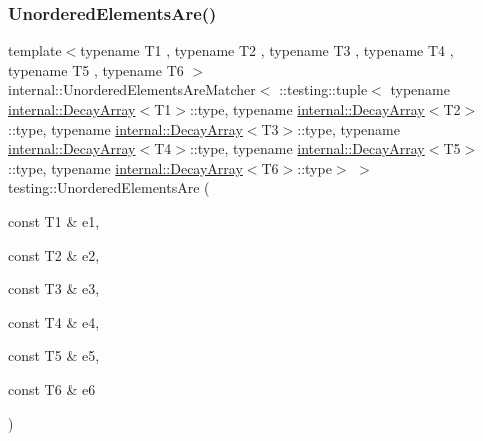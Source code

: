\subsubsection{\texorpdfstring{UnorderedElementsAre()}{UnorderedElementsAre()}\hspace{0.1cm}{\footnotesize\ttfamily [7/11]}}
{\footnotesize\ttfamily template$<$typename T1 , typename T2 , typename T3 , typename T4 , typename T5 , typename T6 $>$ \\
internal\+::\+Unordered\+Elements\+Are\+Matcher$<$ \+::testing\+::tuple$<$ typename \mbox{\hyperlink{structtesting_1_1internal_1_1_decay_array}{internal\+::\+Decay\+Array}}$<$T1$>$\+::type, typename \mbox{\hyperlink{structtesting_1_1internal_1_1_decay_array}{internal\+::\+Decay\+Array}}$<$T2$>$\+::type, typename \mbox{\hyperlink{structtesting_1_1internal_1_1_decay_array}{internal\+::\+Decay\+Array}}$<$T3$>$\+::type, typename \mbox{\hyperlink{structtesting_1_1internal_1_1_decay_array}{internal\+::\+Decay\+Array}}$<$T4$>$\+::type, typename \mbox{\hyperlink{structtesting_1_1internal_1_1_decay_array}{internal\+::\+Decay\+Array}}$<$T5$>$\+::type, typename \mbox{\hyperlink{structtesting_1_1internal_1_1_decay_array}{internal\+::\+Decay\+Array}}$<$T6$>$\+::type$>$ $>$ testing\+::\+Unordered\+Elements\+Are (\begin{DoxyParamCaption}\item[{const T1 \&}]{e1,  }\item[{const T2 \&}]{e2,  }\item[{const T3 \&}]{e3,  }\item[{const T4 \&}]{e4,  }\item[{const T5 \&}]{e5,  }\item[{const T6 \&}]{e6 }\end{DoxyParamCaption})\hspace{0.3cm}{\ttfamily [inline]}}

\mbox{\label{namespacetesting_add6e16fe24c45e39e92c0d19c04acf11}} 
